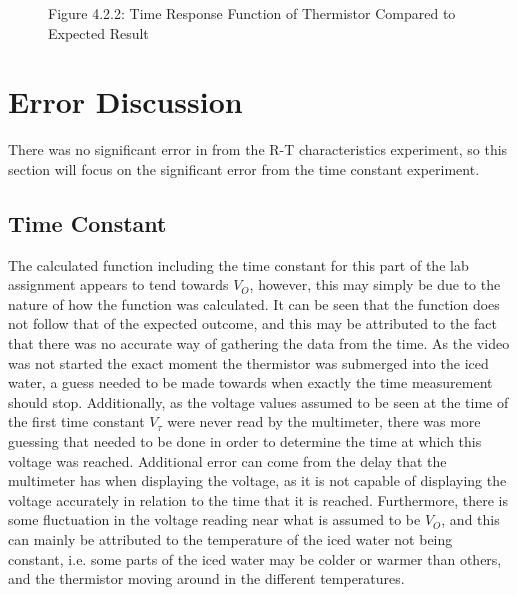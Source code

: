 \documentclass[a4,11pt]{article}
\begin{document}
\begin{figure}[H]
	\centering
	\label{fig:timeresponseideal}
	Figure 4.2.2: Time Response Function of Thermistor Compared to Expected Result
\end{figure}

\section{Error Discussion}
\label{sec:error}
There was no significant error in from the R-T characteristics experiment, so this section will focus on the significant error from the time constant experiment.
\subsection{Time Constant}
The calculated function including the time constant for this part of the lab assignment appears to tend towards $V_O$, however, this may simply be due to the nature of how the function was calculated. It can be seen that the function does not follow that of the expected outcome, and this may be attributed to the fact that there was no accurate way of gathering the data from the time. As the video was not started the exact moment the thermistor was submerged into the iced water, a guess needed to be made towards when exactly the time measurement should stop. Additionally, as the voltage values assumed to be seen at the time of the first time constant $V_\tau$ were never read by the multimeter, there was more guessing that needed to be done in order to determine the time at which this voltage was reached. Additional error can come from the delay that the multimeter has when displaying the voltage, as it is not capable of displaying the voltage accurately in relation to the time that it is reached. Furthermore, there is some fluctuation in the voltage reading near what is assumed to be $V_O$, and this can mainly be attributed to the temperature of the iced water not being constant, i.e. some parts of the iced water may be colder or warmer than others, and the thermistor moving around in the different temperatures.
\end{document}
